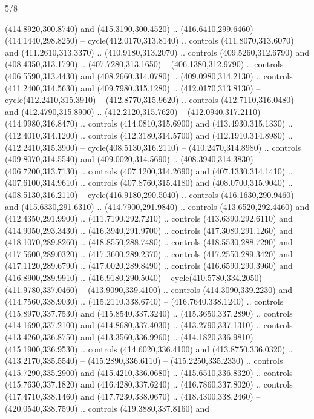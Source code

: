 \begin{flagdescription}{5/8}
\begin{scope}[xshift=0.5\flaglength,yshift=0.5\flagwidth,scale=\flagwidth/475.63]
\begin{scope}[y=0.8pt, x=0.8pt, yscale=-1, xscale=1,shift={(-450,-300)}]
\begin{scope}[cm={{1.0,0.0,0.0,1.0,(-0.0002,0.12556)}},cm={{1.0,0.0,0.0,1.0,(0.00179,0.0)}}]
\begin{scope}[fill=c00863d]
  (414.8920,300.8740) and (415.3190,300.4520) .. (416.6410,299.6460) --
  (414.1440,298.8250) -- cycle(412.0170,313.8140) .. controls
  (411.8070,313.6070) and (411.2610,313.3370) .. (410.9180,313.2070) .. controls
  (409.5260,312.6790) and (408.4350,313.1790) .. (407.7280,313.1650) --
  (406.1380,312.9790) .. controls (406.5590,313.4430) and (408.2660,314.0780) ..
  (409.0980,314.2130) .. controls (411.2400,314.5630) and (409.7980,315.1280) ..
  (412.0170,313.8130) -- cycle(412.2410,315.3910) -- (412.8770,315.9620) ..
  controls (412.7110,316.0480) and (412.4790,315.8900) .. (412.2120,315.7620) --
  (412.0940,317.2110) -- (414.9980,316.8470) .. controls (414.0810,315.6900) and
  (413.4930,315.1330) .. (412.4010,314.1200) .. controls (412.3180,314.5700) and
  (412.1910,314.8980) .. (412.2410,315.3900) -- cycle(408.5130,316.2110) --
  (410.2470,314.8980) .. controls (409.8070,314.5540) and (409.0020,314.5690) ..
  (408.3940,314.3830) -- (406.7200,313.7130) .. controls (407.1200,314.2690) and
  (407.1330,314.1410) .. (407.6100,314.9610) .. controls (407.8760,315.4180) and
  (408.0700,315.9040) .. (408.5130,316.2110) -- cycle(416.9180,290.5040) ..
  controls (416.1630,290.9460) and (415.6330,291.6310) .. (414.7900,291.9840) ..
  controls (413.6520,292.4460) and (412.4350,291.9900) .. (411.7190,292.7210) ..
  controls (413.6390,292.6110) and (414.9050,293.3430) .. (416.3940,291.9700) ..
  controls (417.3080,291.1260) and (418.1070,289.8260) .. (418.8550,288.7480) ..
  controls (418.5530,288.7290) and (417.5600,289.0320) .. (417.3600,289.2370) ..
  controls (417.2550,289.3420) and (417.1120,289.6790) .. (417.0020,289.8490) ..
  controls (416.6590,290.3960) and (416.8900,289.9910) .. (416.9180,290.5040) --
  cycle(410.5780,334.2050) -- (411.9780,337.0460) -- (413.9090,339.4100) ..
  controls (414.3090,339.2230) and (414.7560,338.9030) .. (415.2110,338.6740) --
  (416.7640,338.1240) .. controls (415.8970,337.7530) and (415.8540,337.3240) ..
  (415.3650,337.2890) .. controls (414.1690,337.2100) and (414.8680,337.4030) ..
  (413.2790,337.1310) .. controls (413.4260,336.8750) and (413.3560,336.9960) ..
  (414.1820,336.9810) -- (415.1900,336.9530) .. controls (414.6020,336.4100) and
  (413.8750,336.0320) .. (413.2170,335.5540) -- (415.2890,336.6110) --
  (415.2250,335.2330) .. controls (415.7290,335.2900) and (415.4210,336.0680) ..
  (415.6510,336.8320) .. controls (415.7630,337.1820) and (416.4280,337.6240) ..
  (416.7860,337.8020) .. controls (417.4710,338.1460) and (417.7230,338.0670) ..
  (418.4300,338.2460) -- (420.0540,338.7590) .. controls (419.3880,337.8160) and

\end{scope}
\end{scope}
\end{scope}
\end{scope}
\end{flagdescription}
